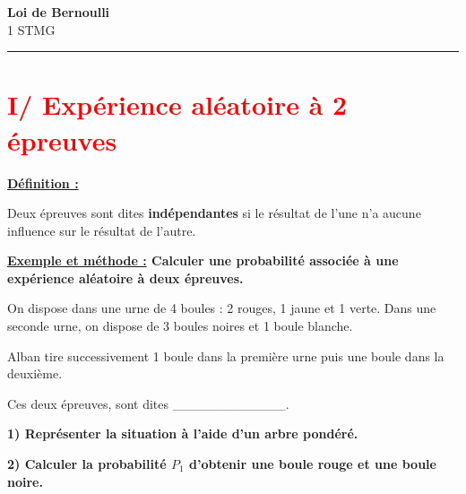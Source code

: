 \documentclass[12pt]{article}
\begin{document}

\newpage

\begin{center}
    {\LARGE \textbf{Loi de Bernoulli}}\\[4mm]
    {\large 1 STMG}
\end{center}

\vspace{10pt}
\hrule
\vspace{0pt}


\section*{\textcolor{red}{I/ Expérience aléatoire à 2 épreuves}}

\vspace{5pt}

\begin{mdframed}[
    linewidth=1pt,
    linecolor=ForestGreen,
    innertopmargin=10pt,
    innerbottommargin=10pt
]
{\color{ForestGreen}\textbf{\underline{Définition :}}}  

Deux épreuves sont dites \textbf{indépendantes} si le résultat de l’une n’a aucune influence sur le
résultat de l’autre.

\end{mdframed}

{\color{red}\bf{\underline{Exemple et méthode :}} Calculer une probabilité associée à une expérience aléatoire 
à deux épreuves.}

\vspace{5pt}
On dispose dans une urne de 4 boules : 2 rouges, 1 jaune et 1 verte. Dans une seconde urne, on dispose de 
3 boules noires et 1 boule blanche.

\vspace{5pt}
Alban tire successivement 1 boule dans la première urne puis une boule dans la deuxième.

\vspace{10pt}
Ces deux épreuves, sont dites \_\_\_\_\_\_\_\_\_\_\_\_.

\vspace{10pt}
\hspace{1cm} \textbf{1) Représenter la situation à l'aide d'un arbre pondéré.}

\hspace{1cm} \textbf{2) Calculer la probabilité $P_1$ d'obtenir une boule rouge et une boule noire.}
\end{document}
